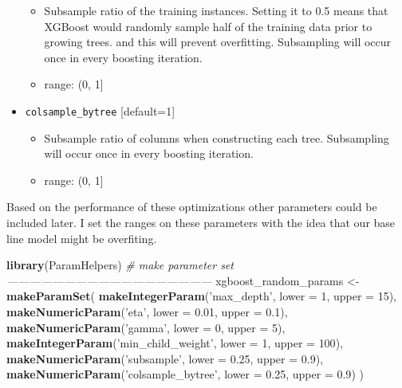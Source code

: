 \documentclass[]{book}
\newenvironment{Shaded}{\begin{snugshade}}{\end{snugshade}}
\newcommand{\KeywordTok}[1]{\textcolor[rgb]{0.13,0.29,0.53}{\textbf{#1}}}
\newcommand{\DataTypeTok}[1]{\textcolor[rgb]{0.13,0.29,0.53}{#1}}
\newcommand{\DecValTok}[1]{\textcolor[rgb]{0.00,0.00,0.81}{#1}}
\newcommand{\FloatTok}[1]{\textcolor[rgb]{0.00,0.00,0.81}{#1}}
\newcommand{\StringTok}[1]{\textcolor[rgb]{0.31,0.60,0.02}{#1}}
\newcommand{\CommentTok}[1]{\textcolor[rgb]{0.56,0.35,0.01}{\textit{#1}}}
\newcommand{\NormalTok}[1]{#1}
\providecommand{\tightlist}{%
  \setlength{\itemsep}{0pt}\setlength{\parskip}{0pt}}
\theoremstyle{definition}
\theoremstyle{definition}
\theoremstyle{definition}
\theoremstyle{remark}
\begin{document}
\begin{itemize}
  \begin{itemize}
  \tightlist
  \item
    Subsample ratio of the training instances. Setting it to 0.5 means
    that XGBoost would randomly sample half of the training data prior
    to growing trees. and this will prevent overfitting. Subsampling
    will occur once in every boosting iteration.
  \item
    range: (0, 1{]}
  \end{itemize}
\item
  \texttt{colsample\_bytree} {[}default=1{]}

  \begin{itemize}
  \tightlist
  \item
    Subsample ratio of columns when constructing each tree. Subsampling
    will occur once in every boosting iteration.
  \item
    range: (0, 1{]}
  \end{itemize}
\end{itemize}

Based on the performance of these optimizations other parameters could
be included later. I set the ranges on these parameters with the idea
that our base line model might be overfiting.

\begin{Shaded}
\begin{Highlighting}[]
\KeywordTok{library}\NormalTok{(ParamHelpers)}
\CommentTok{# make parameter set ------------------------------------------------------}
\NormalTok{xgboost_random_params <-}
\StringTok{  }\KeywordTok{makeParamSet}\NormalTok{(}
    \KeywordTok{makeIntegerParam}\NormalTok{(}\StringTok{'max_depth'}\NormalTok{, }\DataTypeTok{lower =} \DecValTok{1}\NormalTok{, }\DataTypeTok{upper =} \DecValTok{15}\NormalTok{),}
    \KeywordTok{makeNumericParam}\NormalTok{(}\StringTok{'eta'}\NormalTok{, }\DataTypeTok{lower =} \FloatTok{0.01}\NormalTok{, }\DataTypeTok{upper =} \FloatTok{0.1}\NormalTok{),}
    \KeywordTok{makeNumericParam}\NormalTok{(}\StringTok{'gamma'}\NormalTok{, }\DataTypeTok{lower =} \DecValTok{0}\NormalTok{, }\DataTypeTok{upper =} \DecValTok{5}\NormalTok{),}
    \KeywordTok{makeIntegerParam}\NormalTok{(}\StringTok{'min_child_weight'}\NormalTok{, }\DataTypeTok{lower =} \DecValTok{1}\NormalTok{, }\DataTypeTok{upper =} \DecValTok{100}\NormalTok{),}
    \KeywordTok{makeNumericParam}\NormalTok{(}\StringTok{'subsample'}\NormalTok{, }\DataTypeTok{lower =} \FloatTok{0.25}\NormalTok{, }\DataTypeTok{upper =} \FloatTok{0.9}\NormalTok{),}
    \KeywordTok{makeNumericParam}\NormalTok{(}\StringTok{'colsample_bytree'}\NormalTok{, }\DataTypeTok{lower =} \FloatTok{0.25}\NormalTok{, }\DataTypeTok{upper =} \FloatTok{0.9}\NormalTok{)}
\NormalTok{  )}
\end{Highlighting}
\end{Shaded}
\end{document}
